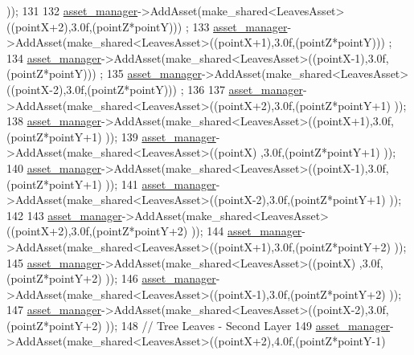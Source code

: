 \begin{DoxyCode}
      ));
131 
132             \hyperlink{classGameWorld_aec5c0bca4fb5a41e4aac2dce2871266d}{asset\_manager}->AddAsset(make\_shared<LeavesAsset>((pointX+2),3.0f,(pointZ*pointY)))
      ;
133             \hyperlink{classGameWorld_aec5c0bca4fb5a41e4aac2dce2871266d}{asset\_manager}->AddAsset(make\_shared<LeavesAsset>((pointX+1),3.0f,(pointZ*pointY)))
      ;
134             \hyperlink{classGameWorld_aec5c0bca4fb5a41e4aac2dce2871266d}{asset\_manager}->AddAsset(make\_shared<LeavesAsset>((pointX-1),3.0f,(pointZ*pointY)))
      ;
135             \hyperlink{classGameWorld_aec5c0bca4fb5a41e4aac2dce2871266d}{asset\_manager}->AddAsset(make\_shared<LeavesAsset>((pointX-2),3.0f,(pointZ*pointY)))
      ; 
136 
137             \hyperlink{classGameWorld_aec5c0bca4fb5a41e4aac2dce2871266d}{asset\_manager}->AddAsset(make\_shared<LeavesAsset>((pointX+2),3.0f,(pointZ*pointY+1)
      ));
138             \hyperlink{classGameWorld_aec5c0bca4fb5a41e4aac2dce2871266d}{asset\_manager}->AddAsset(make\_shared<LeavesAsset>((pointX+1),3.0f,(pointZ*pointY+1)
      ));
139             \hyperlink{classGameWorld_aec5c0bca4fb5a41e4aac2dce2871266d}{asset\_manager}->AddAsset(make\_shared<LeavesAsset>((pointX)  ,3.0f,(pointZ*pointY+1)
      ));
140             \hyperlink{classGameWorld_aec5c0bca4fb5a41e4aac2dce2871266d}{asset\_manager}->AddAsset(make\_shared<LeavesAsset>((pointX-1),3.0f,(pointZ*pointY+1)
      ));
141             \hyperlink{classGameWorld_aec5c0bca4fb5a41e4aac2dce2871266d}{asset\_manager}->AddAsset(make\_shared<LeavesAsset>((pointX-2),3.0f,(pointZ*pointY+1)
      ));
142  
143             \hyperlink{classGameWorld_aec5c0bca4fb5a41e4aac2dce2871266d}{asset\_manager}->AddAsset(make\_shared<LeavesAsset>((pointX+2),3.0f,(pointZ*pointY+2)
      ));
144             \hyperlink{classGameWorld_aec5c0bca4fb5a41e4aac2dce2871266d}{asset\_manager}->AddAsset(make\_shared<LeavesAsset>((pointX+1),3.0f,(pointZ*pointY+2)
      ));
145             \hyperlink{classGameWorld_aec5c0bca4fb5a41e4aac2dce2871266d}{asset\_manager}->AddAsset(make\_shared<LeavesAsset>((pointX)  ,3.0f,(pointZ*pointY+2)
      ));
146             \hyperlink{classGameWorld_aec5c0bca4fb5a41e4aac2dce2871266d}{asset\_manager}->AddAsset(make\_shared<LeavesAsset>((pointX-1),3.0f,(pointZ*pointY+2)
      ));
147             \hyperlink{classGameWorld_aec5c0bca4fb5a41e4aac2dce2871266d}{asset\_manager}->AddAsset(make\_shared<LeavesAsset>((pointX-2),3.0f,(pointZ*pointY+2)
      ));
148             \textcolor{comment}{// Tree Leaves - Second Layer}
149             \hyperlink{classGameWorld_aec5c0bca4fb5a41e4aac2dce2871266d}{asset\_manager}->AddAsset(make\_shared<LeavesAsset>((pointX+2),4.0f,(pointZ*pointY-1)

\end{DoxyCode}
